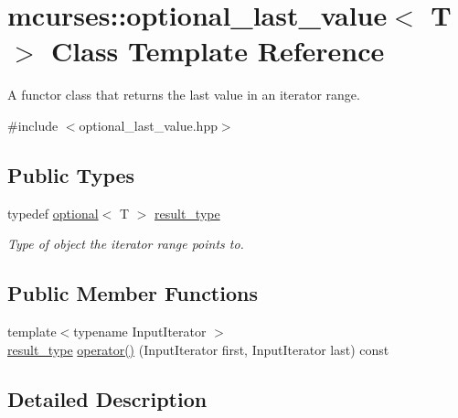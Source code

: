 \hypertarget{classmcurses_1_1optional__last__value}{}\section{mcurses\+:\+:optional\+\_\+last\+\_\+value$<$ T $>$ Class Template Reference}
\label{classmcurses_1_1optional__last__value}


A functor class that returns the last value in an iterator range.  




{\ttfamily \#include $<$optional\+\_\+last\+\_\+value.\+hpp$>$}

\subsection*{Public Types}
\begin{DoxyCompactItemize}
\item 
\hypertarget{classmcurses_1_1optional__last__value_a6d0906441eeb16529466b239fd3d2066}{}\label{classmcurses_1_1optional__last__value_a6d0906441eeb16529466b239fd3d2066} 
typedef \hyperlink{classmcurses_1_1optional}{optional}$<$ T $>$ \hyperlink{classmcurses_1_1optional__last__value_a6d0906441eeb16529466b239fd3d2066}{result\+\_\+type}
\begin{DoxyCompactList}\small\item\em Type of object the iterator range points to. \end{DoxyCompactList}\end{DoxyCompactItemize}
\subsection*{Public Member Functions}
\begin{DoxyCompactItemize}
\item 
{\footnotesize template$<$typename Input\+Iterator $>$ }\\\hyperlink{classmcurses_1_1optional__last__value_a6d0906441eeb16529466b239fd3d2066}{result\+\_\+type} \hyperlink{classmcurses_1_1optional__last__value_a05976d77a820e8f62e71536dc53a22b2}{operator()} (Input\+Iterator first, Input\+Iterator last) const
\end{DoxyCompactItemize}


\subsection{Detailed Description}
